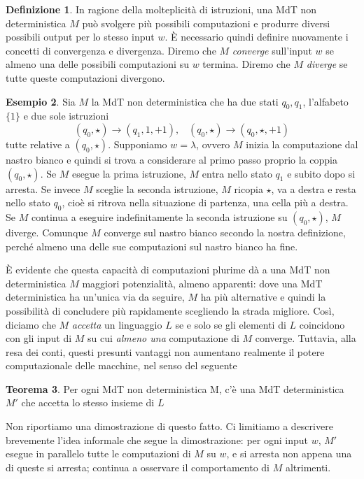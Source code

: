 \documentclass[12pt,a4paper]{report}
\theoremstyle{definition}
\newtheorem{teo}{Teorema}[section]  %
\newtheorem{defn}[teo]{Definizione}  %
\newtheorem{es}[teo]{Esempio}  %
\begin{document}
\begin{defn}
In ragione della molteplicità di istruzioni, una MdT non deterministica $M$ può svolgere più possibili computazioni e produrre diversi possibili output per lo stesso input $w$. È necessario quindi definire nuovamente i concetti di convergenza e divergenza. Diremo che $M$ \emph{converge} sull'input $w$ se almeno una delle possibili computazioni su $w$ termina. Diremo che $M$ \emph{diverge} se tutte queste computazioni divergono.
\end{defn}

\begin{es}
Sia $M$ la MdT non deterministica che ha due stati $q_0,q_1$, l'alfabeto $\{1\}$ e due sole istruzioni 
$$(q_0,\star) \longrightarrow (q_1,1,+1), \;\;\; (q_0,\star) \longrightarrow (q_0,\star,+1)$$
tutte relative a $(q_0,\star)$. Supponiamo $w=\lambda$, ovvero $M$ inizia la computazione dal nastro bianco e quindi si trova a considerare al primo passo proprio la coppia $(q_0,\star)$. Se $M$ esegue la prima istruzione, $M$ entra nello stato $q_1$ e subito dopo si arresta. Se invece $M$ sceglie la seconda istruzione, $M$ ricopia $\star$, va a destra e resta nello stato $q_0$, cioè si ritrova nella situazione di partenza, una cella più a destra. Se $M$ continua a eseguire indefinitamente la seconda istruzione su $(q_0,\star)$, $M$ diverge. Comunque $M$ converge sul nastro bianco secondo la nostra definizione, perché almeno una delle sue computazioni sul nastro bianco ha fine.
\end{es}

È evidente che questa capacità di computazioni plurime dà a una MdT non deterministica $M$ maggiori potenzialità, almeno apparenti: dove una MdT deterministica ha un'unica via da seguire, $M$ ha più alternative e quindi la possibilità di concludere più rapidamente scegliendo la strada migliore. Così, diciamo che $M$ \emph{accetta} un linguaggio $L$ se e solo se gli elementi di $L$ coincidono con gli input di $M$ su cui \emph{almeno una} computazione di $M$ converge. Tuttavia, alla resa dei conti, questi presunti vantaggi non aumentano realmente il potere computazionale delle macchine, nel senso del seguente

\begin{teo}
Per ogni MdT non deterministica M, c'è una MdT deterministica $M'$ che accetta lo stesso insieme di $L$
\end{teo}

Non riportiamo una dimostrazione di questo fatto. Ci limitiamo a descrivere brevemente l'idea informale che segue la dimostrazione: per ogni input $w$, $M'$ esegue in parallelo tutte le computazioni di $M$ su $w$, e si arresta non appena una di queste si arresta; continua a osservare il comportamento di $M$ altrimenti.
\end{document}
